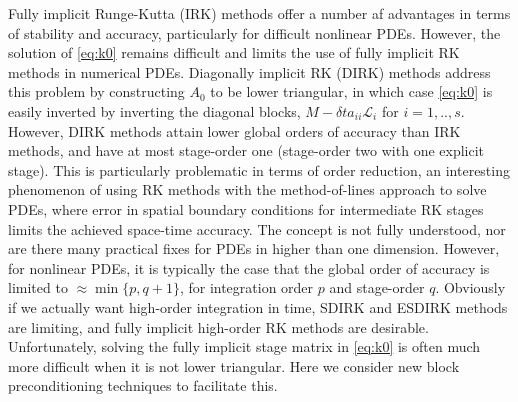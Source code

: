 \documentclass[a4paper,10pt]{article}
\begin{document}
Fully implicit Runge-Kutta (IRK) methods offer a number af advantages in terms of stability and
accuracy, particularly for difficult nonlinear PDEs. However, the solution of \eqref{eq:k0}
remains difficult and limits the use of fully implicit RK methods in numerical PDEs.
Diagonally implicit RK (DIRK) methods address this problem by constructing $A_0$ to be lower
triangular, in which case \eqref{eq:k0} is easily inverted by inverting the diagonal
blocks, $M - \delta ta_{ii}\mathcal{L}_i$ for $i=1,..,s$. However, DIRK methods attain
lower global orders of accuracy than IRK methods, and have at most stage-order one (stage-order
two with one explicit stage). This is particularly problematic in terms of order reduction,
an interesting phenomenon of using RK methods with the method-of-lines approach to solve PDEs,
where error in spatial boundary conditions for intermediate RK stages limits the achieved space-time
accuracy. The concept is not fully understood, nor are there many practical fixes for PDEs
in higher than one dimension. However, for nonlinear PDEs, it is typically the case that the global 
order of accuracy is limited to $\approx \min\{ p, q+1\}$, for integration order $p$ and stage-order
$q$. Obviously if we actually want high-order integration in time, SDIRK and ESDIRK methods
are limiting, and fully implicit high-order RK methods are desirable. Unfortunately, solving the
fully implicit stage matrix in \eqref{eq:k0} is often much more difficult when it is not lower triangular.
Here we consider new block preconditioning techniques to facilitate this.
\end{document}
